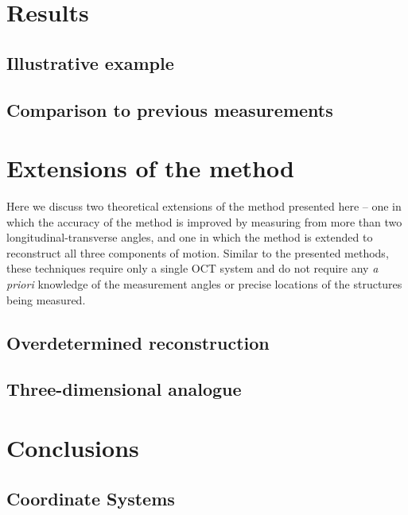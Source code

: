\documentclass[preprint,NumberedRefs]{JASA}
\begin{document}
\section{Results}
\subsection{Illustrative example}
\subsection{Comparison to previous measurements}

\section{Extensions of the method}
\par{Here we discuss two theoretical extensions of the method presented here -- one in which the accuracy of the method is improved by measuring from more than two longitudinal-transverse angles, and one in which the method is extended to reconstruct all three components of motion. Similar to the presented methods, these techniques require only a single OCT system and do not require any \textit{a priori} knowledge of the measurement angles or precise locations of the structures being measured.}
\subsection{Overdetermined reconstruction}
\subsection{Three-dimensional analogue}

\section{Conclusions}

\subsection{Coordinate Systems}
\end{document}

